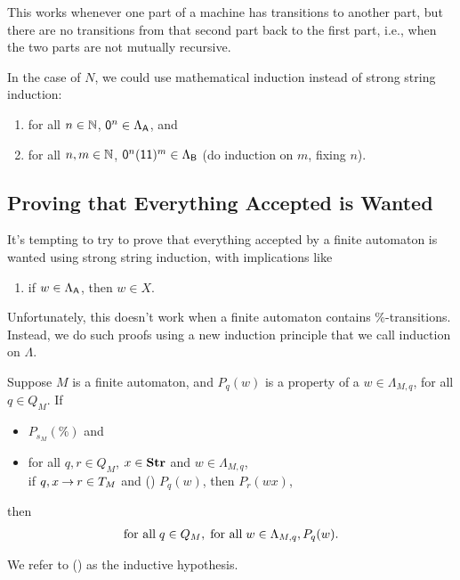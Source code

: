 This works whenever one part of a machine has transitions to
another part, but there are no transitions from that second part
back to the first part, i.e., when the two parts are not mutually
recursive.

In the case of $N$, we could use mathematical induction instead of
strong string induction:
\begin{enumerate}[\quad(A)]
\item for all $n\in\mathbb{N}$, $\mathsf{0}^n\in\Lambda_{\mathsf{A}}$, and

\item for all $n,m\in\mathbb{N}$, $\mathsf{0}^n(\mathsf{1}\mathsf{1})^m\in\Lambda_{\mathsf{B}}$
(do induction on $m$, fixing $n$).
\end{enumerate}

\subsection{Proving that Everything Accepted is Wanted}

It's tempting to try to prove that everything accepted by a finite
automaton is wanted using strong string induction, with implications
like
\begin{enumerate}[\quad(A)]
\item if $w\in\Lambda_{\mathsf{A}}$, then $w\in X$.
\end{enumerate}
Unfortunately, this doesn't work when a finite automaton contains
$\%$-transitions.  Instead, we do such proofs using a new induction
principle that we call induction on $\Lambda$.

\begin{theorem}
Suppose $M$ is a finite automaton, and $P_q(w)$ is a property
of a $w\in\Lambda_{M,q}$, for all $q\in Q_M$.
If
\begin{itemize}
\item $P_{s_M}(\%)$ and

\item for all $q,r\in Q_M$, $x\in\mathbf{Str}$ and $w\in\Lambda_{M,q}$,\\
if $q, x\mathbin{\to} r\in T_M$ and (\dag) $P_q(w)$, then  $P_r(wx)$,
\end{itemize}
then
\begin{gather*}
\allowbreak\mbox{for all}\allowbreak\;q\in Q_M,\;\allowbreak\mbox{for all}\allowbreak\;w\in\Lambda_{M,q}, P_q(w) .
\end{gather*}
\end{theorem}

We refer to (\dag) as the inductive hypothesis.

